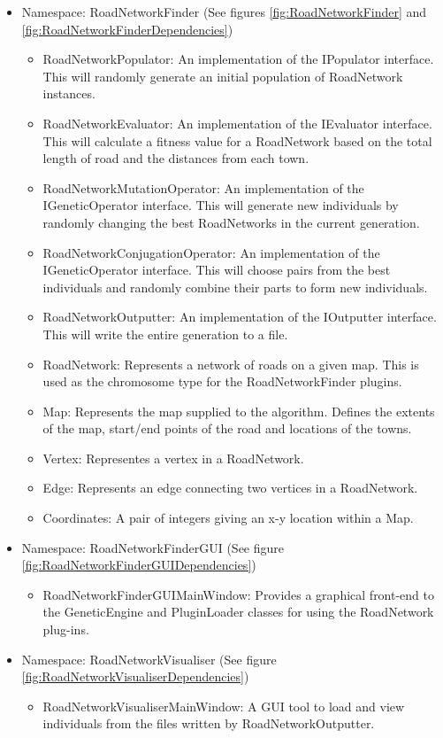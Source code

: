 \begin{itemize}
\item Namespace: RoadNetworkFinder (See figures \ref{fig:RoadNetworkFinder} and \ref{fig:RoadNetworkFinderDependencies})
	\begin{itemize}
	\item RoadNetworkPopulator: An implementation of the IPopulator interface. This will randomly generate an initial population of RoadNetwork instances.
	\item RoadNetworkEvaluator: An implementation of the IEvaluator interface. This will calculate a fitness value for a RoadNetwork based on the total length of road and the distances from each town.
	\item RoadNetworkMutationOperator: An implementation of the IGeneticOperator interface. This will generate new individuals by randomly changing the best RoadNetworks in the current generation.
	\item RoadNetworkConjugationOperator: An implementation of the IGeneticOperator interface. This will choose pairs from the best individuals and randomly combine their parts to form new individuals.
	\item RoadNetworkOutputter: An implementation of the IOutputter interface. This will write the entire generation to a file.
	\item RoadNetwork: Represents a network of roads on a given map. This is used as the chromosome type for the RoadNetworkFinder plugins.
	\item Map: Represents the map supplied to the algorithm. Defines the extents of the map, start/end points of the road and locations of the towns.
	\item Vertex: Representes a vertex in a RoadNetwork.
	\item Edge: Represents an edge connecting two vertices in a RoadNetwork.
	\item Coordinates: A pair of integers giving an x-y location within a Map.
	\end{itemize}
	
\item Namespace: RoadNetworkFinderGUI (See figure \ref{fig:RoadNetworkFinderGUIDependencies})
	\begin{itemize}
	\item RoadNetworkFinderGUIMainWindow: Provides a graphical front-end to the GeneticEngine and PluginLoader classes for using the RoadNetwork plug-ins.
	\end{itemize}
	
\item Namespace: RoadNetworkVisualiser (See figure \ref{fig:RoadNetworkVisualiserDependencies})
	\begin{itemize}
	\item RoadNetworkVisualiserMainWindow: A GUI tool to load and view individuals from the files written by RoadNetworkOutputter.
	\end{itemize}

\end{itemize}

